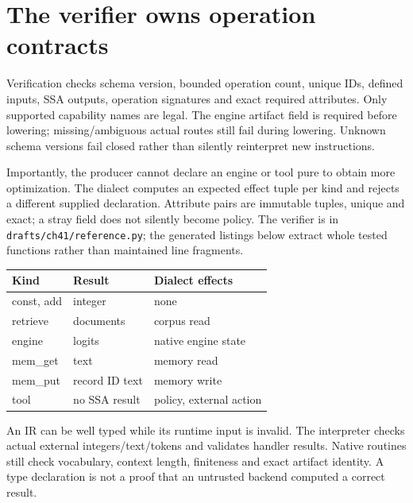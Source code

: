 
\section{The verifier owns operation contracts}
\label{evod41:verify}
Verification checks schema version, bounded operation count, unique IDs,
defined inputs, SSA outputs, operation signatures and exact required attributes.
Only supported capability names are legal. The engine artifact field is
required before lowering; missing/ambiguous actual routes still fail during
lowering. Unknown schema versions fail closed rather than silently reinterpret
new instructions.

Importantly, the producer cannot declare an engine or tool pure to obtain
more optimization. The dialect computes an expected effect tuple per kind
and rejects a different supplied declaration. Attribute pairs are immutable
tuples, unique and exact; a stray field does not silently become policy.
The verifier is in \texttt{drafts/ch41/reference.py}; the generated listings
below extract whole tested functions rather than maintained line fragments.

\begin{center}\begin{tabular}{lll}\toprule
Kind & Result & Dialect effects\\\midrule
const, add & integer & none\\
retrieve & documents & corpus read\\
engine & logits & native engine state\\
mem\_get & text & memory read\\
mem\_put & record ID text & memory write\\
tool & no SSA result & policy, external action\\\bottomrule
\end{tabular}\end{center}

An IR can be well typed while its runtime input is invalid. The interpreter
checks actual external integers/text/tokens and validates handler results.
Native routines still check vocabulary, context length, finiteness and exact
artifact identity. A type declaration is not a proof that an untrusted
backend computed a correct result.


